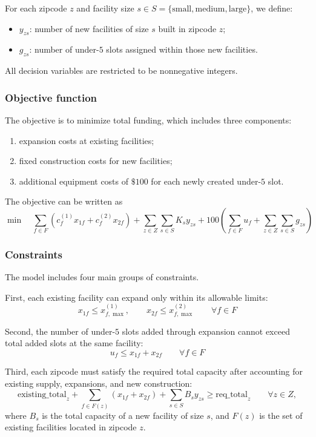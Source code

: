 \documentclass[11pt]{article}
\newcommand{\1}{\mathbb{I}}
\begin{document}
\noindent
For each zipcode \(z\) and facility size \(s \in S=\{\text{small},\text{medium},\text{large}\}\), we define:
\begin{itemize}
    \item \(y_{zs}\): number of new facilities of size \(s\) built in zipcode \(z\);
    \item \(g_{zs}\): number of under-\(5\) slots assigned within those new facilities.
\end{itemize}

\noindent
All decision variables are restricted to be nonnegative integers.

\subsubsection{Objective function}

The objective is to minimize total funding, which includes three components:
\begin{enumerate}
    \item expansion costs at existing facilities;
    \item fixed construction costs for new facilities;
    \item additional equipment costs of \(\$100\) for each newly created under-\(5\) slot.
\end{enumerate}

\noindent
The objective can be written as
\[
\min \quad
\sum_{f \in F} \left(c_f^{(1)} x_{1f} + c_f^{(2)} x_{2f}\right)
+
\sum_{z \in Z} \sum_{s \in S} K_s y_{zs}
+
100\left(\sum_{f \in F} u_f + \sum_{z \in Z} \sum_{s \in S} g_{zs}\right)
\]

\subsubsection{Constraints}

The model includes four main groups of constraints.

First, each existing facility can expand only within its allowable limits:
\[
x_{1f} \le x^{(1)}_{f,\max},
\qquad
x_{2f} \le x^{(2)}_{f,\max}
\qquad \forall f \in F
\]

Second, the number of under-\(5\) slots added through expansion cannot exceed total added slots at the same facility:
\[
u_f \le x_{1f} + x_{2f}
\qquad \forall f \in F
\]

Third, each zipcode must satisfy the required total capacity after accounting for existing supply, expansions, and new construction:
\[
\mathrm{existing\_total}_z
+
\sum_{f \in F(z)} \left(x_{1f}+x_{2f}\right)
+
\sum_{s \in S} B_s y_{zs}
\ge
\mathrm{req\_total}_z
\qquad \forall z \in Z,
\]
where \(B_s\) is the total capacity of a new facility of size \(s\), and \(F(z)\) is the set of existing facilities located in zipcode \(z\).
\end{document}
